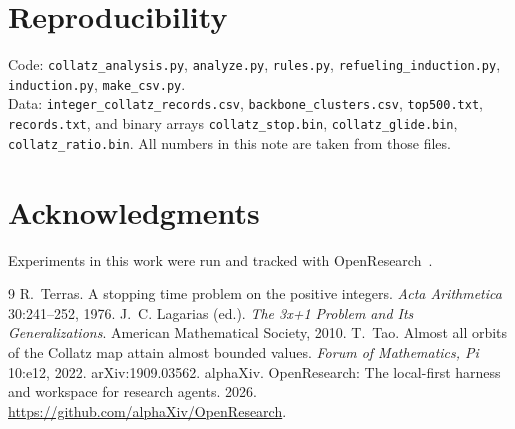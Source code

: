 \documentclass[11pt]{article}
\theoremstyle{remark}
\begin{document}
\section*{Reproducibility}
Code: \texttt{collatz\_analysis.py}, \texttt{analyze.py}, \texttt{rules.py},
\texttt{refueling\_induction.py}, \texttt{induction.py},
\texttt{make\_csv.py}.\\
Data: \texttt{integer\_collatz\_records.csv},
\texttt{backbone\_clusters.csv}, \texttt{top500.txt},
\texttt{records.txt}, and binary arrays
\texttt{collatz\_stop.bin}, \texttt{collatz\_glide.bin},
\texttt{collatz\_ratio.bin}. All numbers in this note are taken from those
files.

\section*{Acknowledgments}
Experiments in this work were run and tracked with OpenResearch~\citep{openresearch}.

\begin{thebibliography}{9}
 R.~Terras. A stopping time problem on the
  positive integers. \emph{Acta Arithmetica} 30:241--252, 1976.
 J.~C. Lagarias (ed.). \emph{The
  3x+1 Problem and Its Generalizations}. American Mathematical Society,
  2010.
 T.~Tao. Almost all orbits of the Collatz map
  attain almost bounded values. \emph{Forum of Mathematics, Pi} 10:e12,
  2022. arXiv:1909.03562.
 alphaXiv. OpenResearch: The
  local-first harness and workspace for research agents. 2026.
  \url{https://github.com/alphaXiv/OpenResearch}.
\end{thebibliography}
\end{document}

